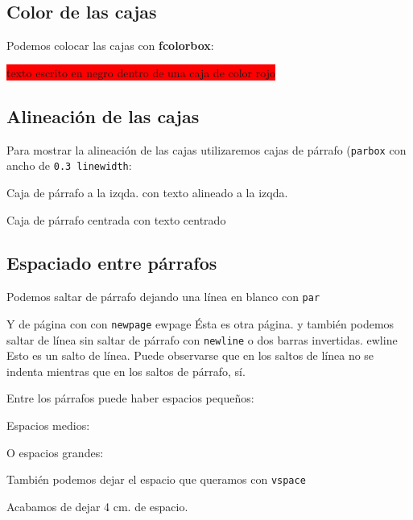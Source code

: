 \documentclass[11pt,twoside,a4paper]{article}
\begin{document}
\subsection{Color de las cajas}
\label{sec:colorcajas}

Podemos colocar las cajas con \textbf{fcolorbox}:

\colorbox{red}{texto escrito en negro dentro de una caja de color rojo}
\\



\subsection{Alineación de las cajas}
\label{sec:alineacioncajas}

Para mostrar la alineación de las cajas utilizaremos cajas de párrafo (\texttt{parbox} con ancho de \texttt{0.3 linewidth}:

\parbox[b]{0.3\linewidth}{\raggedright{Caja de párrafo a la izqda. con texto alineado a la izqda.}}
\parbox[b]{0.3\linewidth}{\centering Caja de párrafo centrada con texto centrado}
\parbox[b]{0.3\linewidth}{}

\subsection{Espaciado entre párrafos}
\label{sec:espaciadoparrafos}

Podemos saltar de párrafo dejando una línea en blanco con \texttt{par}\par Y de página con con \texttt{newpage}
ewpage{}
Ésta es otra página. y también podemos saltar de línea sin saltar de párrafo con \texttt{newline} o dos barras invertidas.
ewline{} Esto es un salto de línea. Puede observarse que en los saltos de línea no se indenta mientras que en los saltos de párrafo, sí.

Entre los párrafos puede haber espacios pequeños:\smallskip{}

Espacios medios:
\medskip{}

O espacios grandes:
\bigskip{}

También podemos dejar el espacio que queramos con \texttt{vspace}\vspace{4cm}

Acabamos de dejar 4 cm. de espacio.
\end{document}

